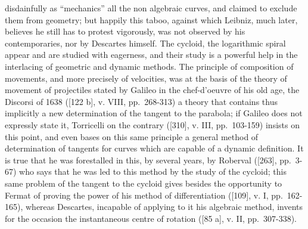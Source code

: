\begin{enumerate}
disdainfully as ``mechanics'' all the non algebraic curves, and claimed to exclude them from geometry; but happily this taboo, against which Leibniz, much later, believes he still has to protest vigorously, was not observed by his contemporaries, nor by Descartes himself. The cycloid, the logarithmic spiral appear and are studied with eagerness, and their study is a powerful help in the interlacing of geometric and dynamic methods. The principle of composition of movements, and more precisely of velocities, was at the basis of the theory of movement of projectiles stated by Galileo in the chef-d'oeuvre of his old age, the Discorsi of 1638 ({[}122 b{]}, v. VIII, pp.~268-313) a theory that contains thus implicitly a new determination of the tangent to the parabola; if Galileo does not expressly state it, Torricelli on the contrary ({[}310{]}, v. III, pp.~103-159) insists on this point, and even bases on this same principle a general method of determination of tangents for curves which are capable of a dynamic definition. It is true that he was forestalled in this, by several years, by Roberval ({[}263{]}, pp.~3-67) who says that he was led to this method by the study of the cycloid; this same problem of the tangent to the cycloid gives besides the opportunity to Fermat of proving the power of his method of differentiation ({[}109{]}, v. I, pp.~162-165), whereas Descartes, incapable of applying to it his algebraic method, invents for the occasion the instantaneous centre of rotation ({[}85 a{]}, v. II, pp.~307-338).
\end{enumerate}

